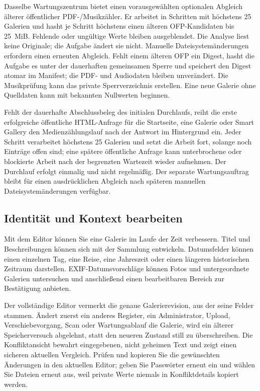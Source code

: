 \documentclass[11pt,a4paper]{article}
\newcommand{\filepath}[1]{\path{#1}}
\begin{document}
Dasselbe Wartungszentrum bietet einen vorausgewählten optionalen Abgleich
älterer öffentlicher PDF-/Musikzähler. Er arbeitet in Schritten mit höchstens
25 Galerien und hasht je Schritt höchstens einen älteren OFP-Kandidaten bis
25~MiB. Fehlende oder ungültige Werte bleiben ausgeblendet. Die Analyse liest
keine Originale; die Aufgabe ändert sie nicht. Manuelle Dateisystemänderungen
erfordern einen erneuten Abgleich. Fehlt einem älteren OFP ein Digest, hasht die
Aufgabe es unter der dauerhaften gemeinsamen Sperre und speichert den Digest
atomar im Manifest; die PDF- und Audiodaten bleiben unverändert. Die
Musikprüfung kann das private Sperrverzeichnis \filepath{.gallery-music/}
erstellen. Eine neue Galerie ohne Quelldaten kann mit bekannten Nullwerten
beginnen.

Fehlt der dauerhafte Abschlussbeleg des initialen Durchlaufs, reiht die erste
erfolgreiche öffentliche HTML-Anfrage für die Startseite, eine Galerie oder
Smart Gallery den Medienzählungslauf nach der Antwort im Hintergrund ein. Jeder
Schritt verarbeitet höchstens 25 Galerien und setzt die Arbeit fort, solange
noch Einträge offen sind; eine spätere öffentliche Anfrage kann unterbrochene
oder blockierte Arbeit nach der begrenzten Wartezeit wieder aufnehmen. Der
Durchlauf erfolgt einmalig und nicht regelmäßig. Der separate Wartungsauftrag
bleibt für einen ausdrücklichen Abgleich nach späteren manuellen
Dateisystemänderungen verfügbar.

\subsection{Identität und Kontext bearbeiten}

Mit dem Editor können Sie eine Galerie im Laufe der Zeit verbessern. Titel und
Beschreibungen können sich mit der Sammlung entwickeln. Datumsfelder können
einen einzelnen Tag, eine Reise, eine Jahreszeit oder einen längeren
historischen Zeitraum darstellen. EXIF-Datumsvorschläge können Fotos und
untergeordnete Galerien untersuchen und anschließend einen bearbeitbaren Bereich
zur Bestätigung anbieten.

Der vollständige Editor vermerkt die genaue Galerierevision, aus der seine
Felder stammen. Ändert zuerst ein anderes Register, ein Administrator, Upload,
Verschiebevorgang, Scan oder Wartungsablauf die Galerie, wird ein älterer
Speicherversuch abgelehnt, statt den neueren Zustand still zu überschreiben. Die
Konfliktansicht bewahrt eingegebenen, nicht geheimen Text und zeigt einen
sicheren aktuellen Vergleich. Prüfen und kopieren Sie die gewünschten Änderungen
in den aktuellen Editor; geben Sie Passwörter erneut ein und wählen Sie Dateien
erneut aus, weil private Werte niemals in Konfliktdetails kopiert werden.
\end{document}

